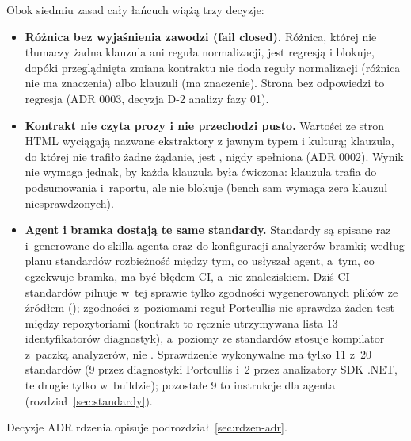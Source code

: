Obok siedmiu zasad cały łańcuch wiążą trzy decyzje:

\begin{itemize}
  \item \textbf{Różnica bez wyjaśnienia zawodzi (fail closed).} Różnica, której nie tłumaczy
        żadna klauzula ani reguła normalizacji, jest regresją 
        i blokuje, dopóki przeglądnięta zmiana kontraktu nie doda reguły normalizacji
        (różnica nie ma znaczenia) albo klauzuli (ma znaczenie). Strona bez odpowiedzi to
        regresja  (ADR 0003, decyzja D-2 analizy fazy 01).
  \item \textbf{Kontrakt nie czyta prozy i nie przechodzi pusto.} Wartości ze stron HTML
        wyciągają nazwane ekstraktory z jawnym typem i kulturą; klauzula, do której nie
        trafiło żadne żądanie, jest , nigdy spełniona (ADR 0002).
        Wynik  nie wymaga jednak, by każda klauzula była ćwiczona: klauzula
         trafia do podsumowania i~raportu, ale nie blokuje (bench sam
        wymaga zera klauzul niesprawdzonych).
  \item \textbf{Agent i bramka dostają te same standardy.} Standardy są spisane raz
        i~generowane do skilla agenta oraz do konfiguracji analyzerów bramki; według planu
        standardów rozbieżność między tym, co usłyszał agent, a~tym, co egzekwuje bramka,
        ma być błędem CI, a~nie znaleziskiem. Dziś CI standardów pilnuje w~tej sprawie tylko
        zgodności wygenerowanych plików ze źródłem (); zgodności
        z~poziomami reguł Portcullis nie sprawdza żaden test między repozytoriami (kontrakt
        to ręcznie utrzymywana lista 13 identyfikatorów diagnostyk), a~poziomy ze standardów
        stosuje kompilator z~paczką analyzerów, nie . Sprawdzenie
        wykonywalne ma tylko 11 z~20 standardów (9 przez diagnostyki Portcullis i~2 przez
        analizatory SDK .NET, te drugie tylko w~buildzie); pozostałe 9 to instrukcje dla
        agenta (rozdział~\ref{sec:standardy}).
\end{itemize}

Decyzje ADR rdzenia opisuje podrozdział~\ref{sec:rdzen-adr}.


